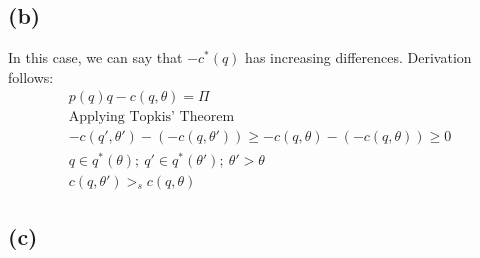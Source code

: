 \documentclass[10pt, a4paper]{article}
\begin{document}
    \subsection*{(b)}
      In this case, we can say that $-c^*(q)$ has increasing differences. Derivation follows:
      \begin{gather*}
        p(q)q - c(q,\theta) = \Pi \\
        \text{Applying Topkis' Theorem} \\
        -c(q',\theta')-(-c(q,\theta')) \geq -c(q,\theta)-(-c(q,\theta)) \geq 0 \\
        q\in q^*(\theta); \ q'\in q^*(\theta'); \ \theta' > \theta \\
        c(q,\theta') >_s c(q,\theta)
      \end{gather*}
    \subsection*{(c)}
\end{document}

